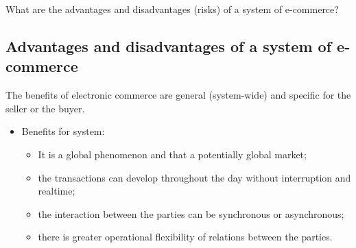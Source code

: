 What are the advantages and disadvantages (risks) of a system of e-commerce?
\newline
\subsection{Advantages and disadvantages of a system of e-commerce}
The benefits of electronic commerce are general (system-wide) and specific for the seller or the buyer.
\begin{itemize}
  \item Benefits for system:
  \begin{itemize}
    \item It is a global phenomenon and that a potentially global market;
    \item the transactions can develop throughout the day without interruption and realtime;
    \item the interaction between the parties can be synchronous or asynchronous;
    \item there is greater operational flexibility of relations between the parties.
  \end{itemize}


\end{itemize}
